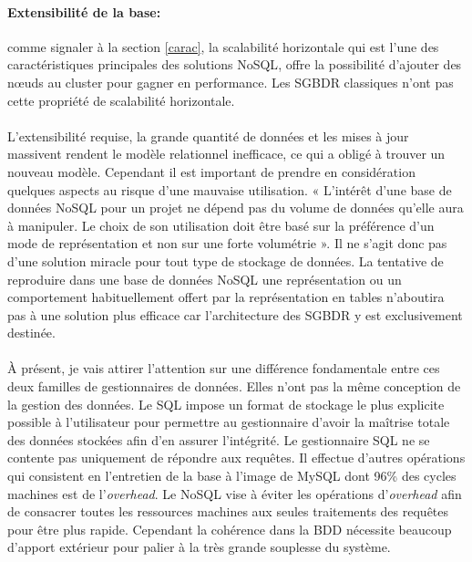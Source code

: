 \paragraph{Extensibilité de la base:} comme signaler à la section \ref{carac}, 
la scalabilité horizontale qui est l'une des caractéristiques principales 
des solutions \textsf{NoSQL}, offre la possibilité 
d'ajouter des nœuds au cluster pour gagner en performance. Les \textsf{SGBDR} classiques 
n'ont pas cette propriété de scalabilité horizontale.
\\ 
\\ 
L'extensibilité requise, la grande quantité de données
et les mises à jour massivent rendent le modèle relationnel inefficace, ce qui a
obligé à trouver un nouveau modèle. Cependant il est important de prendre en
considération quelques aspects au risque d'une mauvaise utilisation. «
L'intérêt d'une base de données \textsf{NoSQL} pour un projet ne
dépend pas du volume de données qu'elle aura à manipuler. Le choix de
son utilisation doit être basé sur la préférence d’un mode de
représentation et non sur une forte volumétrie
»\cite{NoSQLeurope}. Il ne s’agit donc pas d’une solution
miracle pour tout type de stockage de données.  La tentative de
reproduire dans une base de données \textsf{NoSQL} une représentation
ou un comportement habituellement offert par la représentation en tables
n'aboutira pas à une solution plus efficace car l'architecture des 
\textsf{SGBDR} y est exclusivement destinée.
\\
\\
À présent, je vais attirer l'attention sur une différence fondamentale entre ces deux familles de gestionnaires de données. Elles n'ont pas la même conception de la gestion des données. Le \textsf{SQL} impose un format de stockage le plus explicite possible à l'utilisateur pour permettre au gestionnaire d'avoir la maîtrise totale des données stockées afin d'en assurer l'intégrité. Le gestionnaire \textsf{SQL} ne se contente pas uniquement de répondre aux requêtes. Il effectue d'autres opérations qui consistent en l'entretien de la base à l'image de \textsf{MySQL} dont 96\% des cycles machines est de l'\textit{overhead}. Le \textsf{NoSQL} vise à éviter les opérations d'\textit{overhead} afin de consacrer toutes les ressources machines aux seules traitements des requêtes pour être plus rapide. Cependant la cohérence dans la \textsf{BDD} nécessite beaucoup d'apport extérieur pour palier à la très grande souplesse du système.
